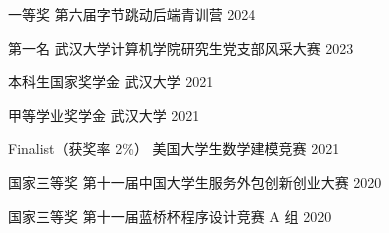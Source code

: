 

\begin{cvhonors}

  \cvhonor
    {一等奖} %
    {第六届字节跳动后端青训营} %
    {} %
    {2024} %

  \cvhonor
    {第一名}
    {武汉大学计算机学院研究生党支部风采大赛}
    {}
    {2023}

  \cvhonor
    {本科生国家奖学金}
    {武汉大学}
    {}
    {2021}

  \cvhonor
    {甲等学业奖学金}
    {武汉大学}
    {}
    {2021}

  \cvhonor
    {Finalist（获奖率 2\%）}
    {美国大学生数学建模竞赛}
    {}
    {2021}
  
  \cvhonor
    {国家三等奖}
    {第十一届中国大学生服务外包创新创业大赛}
    {}
    {2020}

  \cvhonor
    {国家三等奖}
    {第十一届蓝桥杯程序设计竞赛 A 组}
    {}
    {2020}

\end{cvhonors}
